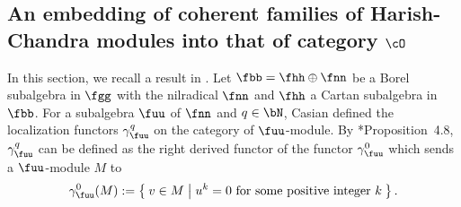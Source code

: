 \documentclass[12pt,a4paper]{amsart}
\numberwithin{equation}{section}
\newtheorem{thm}{Theorem}[section]
\theoremstyle{remark}
\def\Spr{\mathrm{Springer}}
\begin{document}


\subsection{An embedding of coherent families of Harish-Chandra modules into
  that of category $\cO$}
In this section, we recall a result in \cite{Cas}.
Let $\fbb = \fhh\oplus \fnn$ be a Borel subalgebra in $\fgg$ with the nilradical
$\fnn$ and $\fhh$ a Cartan subalgebra in $\fbb$.
For a subalgebra $\fuu$ of $\fnn$ and $q\in \bN$,
Casian defined the localization functors $\gamma_{\fuu}^{q}$ on the category of $\fuu$-module.
By \cite{Cas}*{Proposition~4.8}, $\gamma_{\fuu}^{q}$ can be defined as the right
derived functor of the functor $\gamma_{\fuu}^{0}$ which sends a $\fuu$-module $M$
to
\[
\gamma_{\fuu}^{0}(M):= \Set{v\in M| u^{k} = 0 \text{ for some positive integer
    $k$}}.
\]

\end{document}
